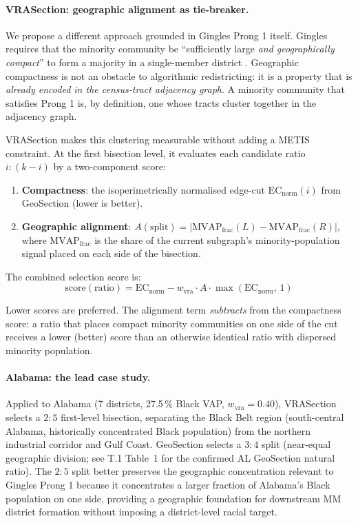 \paragraph{VRASection: geographic alignment as tie-breaker.}
We propose a different approach grounded in Gingles Prong 1 itself.
Gingles requires that the minority community be ``sufficiently large
\emph{and geographically compact}'' to form a majority in a single-member
district \citep{gingles1986}.
Geographic compactness is not an obstacle to algorithmic redistricting:
it is a property that is \emph{already encoded in the census-tract adjacency
graph}.
A minority community that satisfies Prong 1 is, by definition, one whose
tracts cluster together in the adjacency graph.

VRASection makes this clustering measurable without adding a METIS constraint.
At the first bisection level, it evaluates each candidate ratio $i:(k-i)$
by a two-component score:

\begin{enumerate}
\item \textbf{Compactness}: the isoperimetrically normalised edge-cut
  $\mathrm{EC}_\text{norm}(i)$ from GeoSection \citep{b8paper} (lower is better).
\item \textbf{Geographic alignment}: $A(\text{split}) = |\mathrm{MVAP}_\text{frac}(L)
  - \mathrm{MVAP}_\text{frac}(R)|$, where $\mathrm{MVAP}_\text{frac}$ is the
  share of the current subgraph's minority-population signal placed on each
  side of the bisection.
\end{enumerate}

The combined selection score is:
\[
  \text{score}(\text{ratio}) = \mathrm{EC}_{\text{norm}}
  - w_\text{vra} \cdot A \cdot \max(\mathrm{EC}_{\text{norm}},\, 1)
\]

Lower scores are preferred.
The alignment term \emph{subtracts} from the compactness score: a ratio
that places compact minority communities on one side of the cut receives
a lower (better) score than an otherwise identical ratio with dispersed
minority population.

\paragraph{Alabama: the lead case study.}
Applied to Alabama (7 districts, 27.5\,\% Black VAP, $w_\text{vra} = 0.40$),
VRASection selects a $2:5$ first-level bisection, separating the Black Belt
region (south-central Alabama, historically concentrated Black population)
from the northern industrial corridor and Gulf Coast.
GeoSection selects a $3:4$ split (near-equal geographic division; see T.1 Table~1 for the confirmed AL GeoSection natural ratio).
The $2:5$ split better preserves the geographic concentration relevant to
Gingles Prong 1 because it
concentrates a larger fraction of Alabama's Black population on one side,
providing a geographic foundation for downstream MM district formation
without imposing a district-level racial target.

